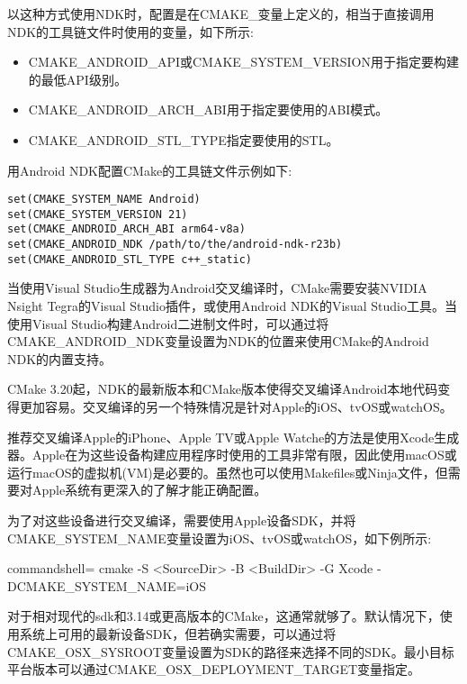 以这种方式使用NDK时，配置是在CMAKE\_变量上定义的，相当于直接调用NDK的工具链文件时使用的变量，如下所示:

\begin{itemize}
\item 
CMAKE\_ANDROID\_API或CMAKE\_SYSTEM\_VERSION用于指定要构建的最低API级别。

\item 
CMAKE\_ANDROID\_ARCH\_ABI用于指定要使用的ABI模式。

\item
CMAKE\_ANDROID\_STL\_TYPE指定要使用的STL。
\end{itemize}

用Android NDK配置CMake的工具链文件示例如下:

\begin{lstlisting}[style=styleCMake]
set(CMAKE_SYSTEM_NAME Android)
set(CMAKE_SYSTEM_VERSION 21)
set(CMAKE_ANDROID_ARCH_ABI arm64-v8a)
set(CMAKE_ANDROID_NDK /path/to/the/android-ndk-r23b)
set(CMAKE_ANDROID_STL_TYPE c++_static)
\end{lstlisting}

当使用Visual Studio生成器为Android交叉编译时，CMake需要安装NVIDIA Nsight Tegra的Visual Studio插件，或使用Android NDK的Visual Studio工具。当使用Visual Studio构建Android二进制文件时，可以通过将CMAKE\_ANDROID\_NDK变量设置为NDK的位置来使用CMake的Android NDK的内置支持。

CMake 3.20起，NDK的最新版本和CMake版本使得交叉编译Android本地代码变得更加容易。交叉编译的另一个特殊情况是针对Apple的iOS、tvOS或watchOS。


推荐交叉编译Apple的iPhone、Apple TV或Apple Watche的方法是使用Xcode生成器。Apple在为这些设备构建应用程序时使用的工具非常有限，因此使用macOS或运行macOS的虚拟机(VM)是必要的。虽然也可以使用Makefiles或Ninja文件，但需要对Apple系统有更深入的了解才能正确配置。

为了对这些设备进行交叉编译，需要使用Apple设备SDK，并将CMAKE\_SYSTEM\_NAME变量设置为iOS、tvOS或watchOS，如下例所示:

\begin{tcblisting}{commandshell={}}
cmake -S <SourceDir> -B <BuildDir> -G Xcode -DCMAKE_SYSTEM_NAME=iOS
\end{tcblisting}

对于相对现代的sdk和3.14或更高版本的CMake，这通常就够了。默认情况下，使用系统上可用的最新设备SDK，但若确实需要，可以通过将CMAKE\_OSX\_SYSROOT变量设置为SDK的路径来选择不同的SDK。最小目标平台版本可以通过CMAKE\_OSX\_DEPLOYMENT\_TARGET变量指定。

